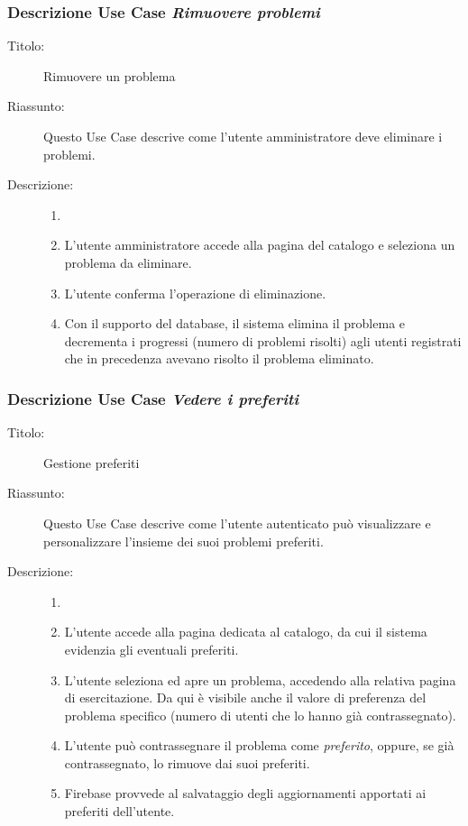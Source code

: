 \documentclass[11pt, a4paper]{article}
\theoremstyle{definition} %
\begin{document}
\subsubsection*{Descrizione Use Case \textit{Rimuovere problemi}}
\begin{description}
    \item[Titolo:] Rimuovere un problema
    
    \item[Riassunto:] Questo Use Case descrive come l'utente amministratore
    deve eliminare i problemi.

    \item[Descrizione:]
    \begin{enumerate}
        \item[]
        \item L'utente amministratore accede alla pagina del catalogo e seleziona un problema da eliminare.
        \item L'utente conferma l'operazione di eliminazione.
        \item Con il supporto del database, il sistema elimina il problema e decrementa i progressi (numero di
        problemi risolti) agli utenti registrati che in precedenza avevano risolto il problema eliminato.
    \end{enumerate}
\end{description}

\subsubsection*{Descrizione Use Case \textit{Vedere i preferiti}}
\begin{description}
    \item[Titolo:] Gestione preferiti
    
    \item[Riassunto:] Questo Use Case descrive come l'utente autenticato
    può visualizzare e personalizzare l'insieme dei suoi problemi preferiti.

    \item[Descrizione:]
    \begin{enumerate}
        \item[]
        \item L'utente accede alla pagina dedicata al catalogo,
        da cui il sistema evidenzia gli eventuali preferiti.

        \item L'utente seleziona ed apre un problema, accedendo alla
        relativa pagina di esercitazione. Da qui è visibile anche il valore
        di preferenza del problema specifico (numero di utenti che lo
        hanno già contrassegnato).

        \item L'utente può contrassegnare il problema come \textit{preferito},
        oppure, se già contrassegnato, lo rimuove dai suoi preferiti.

        \item Firebase provvede al salvataggio degli aggiornamenti apportati
        ai preferiti dell'utente.
    \end{enumerate}
\end{description}
\end{document}
